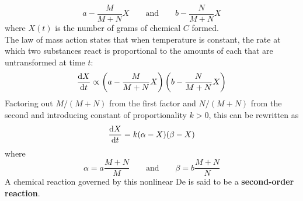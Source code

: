 \documentclass[./Differential Equations.tex]{subfiles}
\begin{document}
				\[a - \frac{M}{M + N}X \qquad \text{and} \qquad b - \frac{N}{M + N}{X}\]
				where \(X(t)\) is the number of grams of chemical \(C\) formed. \\
				The law of mass action states that when temperature is constant, the rate at which two substances react is proportional to the amounts of each that are untransformed at time \(t\):
				\[\dv{X}{t} \propto \left(a - \frac{M}{M + N}X\right)\left(b - \frac{N}{M + N}X\right)\]
				Factoring out \(M/(M + N)\) from the first factor and \(N/(M + N)\) from the second and introducing constant of proportionality \(k > 0\), this can be rewritten as
				\[\dv{X}{t} = k(\alpha - X)(\beta - X)\]
				where
				\[\alpha = a\frac{M + N}{M} \qquad \text{and} \qquad \beta = b\frac{M + N}{N}\]
			A chemical reaction governed by this nonlinear De is said to be a \textbf{second-order reaction}.
\end{document}
